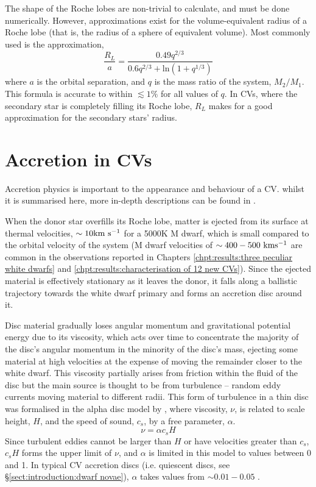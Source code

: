 The shape of the Roche lobes are non-trivial to calculate, and must be done numerically. However, approximations exist for the volume-equivalent radius of a Roche lobe (that is, the radius of a sphere of equivalent volume). Most commonly used is the \citet{Eggleton1983} approximation,
\begin{equation}
    \label{eqn:introduction:eggleton approximation}
    \frac{R_L}{a} = \frac{0.49 q^{2/3}}{0.6 q^{2/3} + \mathrm{ln}(1 + q^{1/3})}
\end{equation}
where $a$ is the orbital separation, and $q$ is the mass ratio of the system, $M_2 / M_1$. This formula is accurate to within $\lesssim 1\%$ for all values of $q$. In CVs, where the secondary star is completely filling its Roche lobe, $R_L$ makes for a good approximation for the secondary stars' radius.


\section{Accretion in CVs}
\label{sect:introduction:accretion}
Accretion physics is important to the appearance and behaviour of a CV. whilst it is summarised here, more in-depth descriptions can be found in \citet{warner1995, hellier2001, ritter2010}.

When the donor star overfills its Roche lobe, matter is ejected from its surface at thermal velocities, $\sim 10 \rm km\ s^{-1}$ for a 5000K M dwarf, which is small compared to the orbital velocity of the system (M dwarf velocities of $\sim 400-500 \rm\ km s^{-1}$ are common in the observations reported in Chapters \ref{chpt:results:three peculiar white dwarfs} and \ref{chpt:results:characterisation of 12 new CVs}). Since the ejected material is effectively stationary as it leaves the donor, it falls along a ballistic trajectory towards the white dwarf primary and forms an accretion disc around it.

Disc material gradually loses angular momentum and gravitational potential energy due to its viscosity, which acts over time to concentrate the majority of the disc's angular momentum in the minority of the disc's mass, ejecting some material at high velocities at the expense of moving the remainder closer to the white dwarf.
This viscosity partially arises from friction within the fluid of the disc but the main source is thought to be from turbulence -- random eddy currents moving material to different radii.
This form of turbulence in a thin disc was formalised in the alpha disc model by \citet{shakura1973}, where viscosity, $\nu$, is related to scale height, $H$, and the speed of sound, $c_s$, by a free parameter, $\alpha$.
\begin{equation}
    \label{eqn:disc viscocity}
    \nu = \alpha c_s H
\end{equation}
Since turbulent eddies cannot be larger than $H$ or have velocities greater than $c_s$, $c_s H$ forms the upper limit of $\nu$, and $\alpha$ is limited in this model to values between 0 and 1. In typical CV accretion discs (i.e. quiescent discs, see \S\ref{sect:introduction:dwarf novae}), $\alpha$ takes values from $\sim 0.01 - 0.05$ \citep{hellier2001}.

